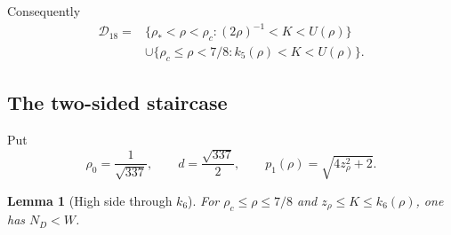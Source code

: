 \documentclass[11pt]{article}
\numberwithin{equation}{section}
\newtheorem{lemma}[theorem]{Lemma}
\theoremstyle{definition}
\theoremstyle{remark}
\begin{document}
Consequently
\begin{equation}
\begin{aligned}
 \mathcal D_{18}={}&
 \{\rho_*<\rho<\rho_c:(2\rho)^{-1}<K<U(\rho)\}\\
 &\cup\{\rho_c\leq\rho<7/8:k_5(\rho)<K<U(\rho)\}.
\end{aligned}
 \label{cm:eq-D18}
\end{equation}

\subsection{The two-sided staircase}

Put
\[
 \rho_0=\frac1{\sqrt{337}},\qquad d=\frac{\sqrt{337}}2,
 \qquad p_1(\rho)=\sqrt{4z_\rho^2+2}.
\]

\begin{lemma}[High side through \(k_6\)]
\label{cm:lem-k6}
For \(\rho_c\leq\rho\leq7/8\) and
\(z_\rho\leq K\leq k_6(\rho)\), one has \(N_D<W\).
\end{lemma}
\end{document}
